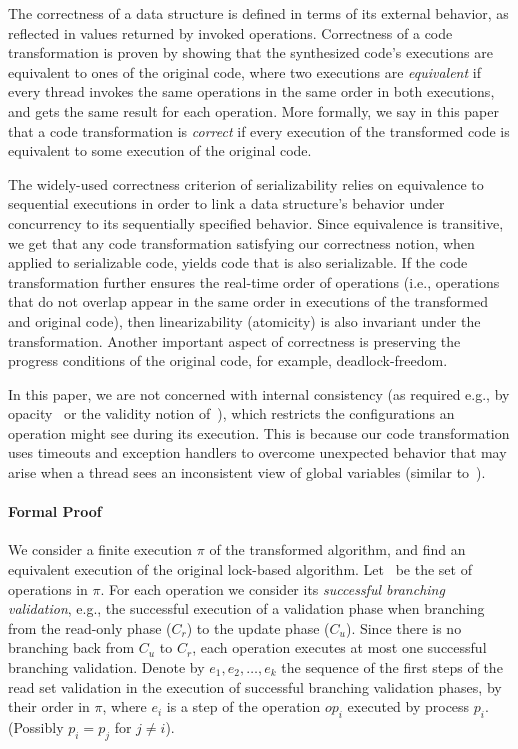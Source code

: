The correctness of a data structure is defined in terms of its external behavior, as reflected in values returned by invoked operations.
Correctness of a code transformation is proven by showing that the synthesized code's executions are equivalent to ones of the original code,
where two executions are  \emph{equivalent} if every thread invokes the same
operations in the same order  in both executions, and gets the same result for each operation. More formally, we say in this paper that a code transformation is \emph{correct} if every execution of the transformed code
is equivalent to some execution of the original code.

The widely-used correctness criterion of serializability relies on equivalence to sequential executions in order to
link a data structure's behavior under concurrency to its sequentially specified behavior. Since equivalence is transitive,
we get that any code transformation satisfying our correctness notion, when applied to serializable code, yields code that is also serializable.
If the code transformation further ensures the real-time order of operations (i.e., operations that do not overlap appear in the same order in 
executions of the transformed and original code), then linearizability (atomicity) is also invariant under the transformation.
Another important aspect of correctness is preserving the progress conditions of the original code, for example, deadlock-freedom.

In this paper, we are not concerned with internal consistency (as required e.g., by opacity~\cite{GuerraouiK2008} or the validity notion of~\cite{LevAriCK2014}),
which restricts the configurations an operation might see during its execution.
This is because our code transformation uses timeouts and exception handlers to overcome unexpected behavior that may arise when a thread sees an inconsistent view of global variables (similar to~\cite{Nakaike:2010}).


\paragraph{Formal Proof}
We consider a finite execution $\pi$ of the transformed
algorithm, and find an equivalent execution of the original lock-based
algorithm.
Let \op\ be the set of operations in $\pi$.
For each operation we consider its \emph{successful branching validation}, e.g.,
the successful execution of a validation phase when branching from the read-only
phase ($C_r$) to the update phase ($C_u$). Since there is no branching back from
$C_u$ to $C_r$, each operation executes at most one successful branching
validation. Denote by $e_1, e_2, \ldots, e_k$ the sequence of the first steps of
the read set validation in the execution of successful branching validation
phases, by their order in $\pi$, where $e_i$ is a step of the operation $op_{i}$ executed by process $p_{i}$.
(Possibly $p_i=p_j$ for $j \neq i$).


